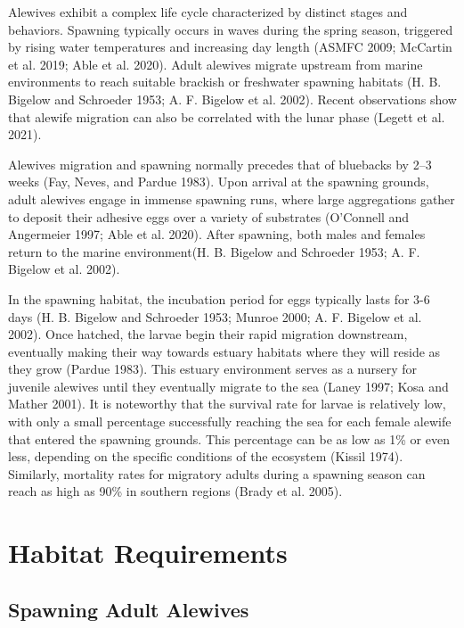 \documentclass[
]{book}
\begin{document}
Alewives exhibit a complex life cycle characterized by distinct stages and behaviors.
Spawning typically occurs in waves during the spring season, triggered by rising water temperatures and increasing day length (ASMFC 2009; McCartin et al. 2019; Able et al. 2020).
Adult alewives migrate upstream from marine environments to reach suitable brackish or freshwater spawning habitats (H. B. Bigelow and Schroeder 1953; A. F. Bigelow et al. 2002).
Recent observations show that alewife migration can also be correlated with the lunar phase (Legett et al. 2021).

Alewives migration and spawning normally precedes that of bluebacks by 2--3 weeks (Fay, Neves, and Pardue 1983).
Upon arrival at the spawning grounds, adult alewives engage in immense spawning runs, where large aggregations gather to deposit their adhesive eggs over a variety of substrates (O'Connell and Angermeier 1997; Able et al. 2020).
After spawning, both males and females return to the marine environment(H. B. Bigelow and Schroeder 1953; A. F. Bigelow et al. 2002).

In the spawning habitat, the incubation period for eggs typically lasts for 3-6 days (H. B. Bigelow and Schroeder 1953; Munroe 2000; A. F. Bigelow et al. 2002).
Once hatched, the larvae begin their rapid migration downstream, eventually making their way towards estuary habitats where they will reside as they grow (Pardue 1983).
This estuary environment serves as a nursery for juvenile alewives until they eventually migrate to the sea (Laney 1997; Kosa and Mather 2001).
It is noteworthy that the survival rate for larvae is relatively low, with only a small percentage successfully reaching the sea for each female alewife that entered the spawning grounds.
This percentage can be as low as 1\% or even less, depending on the specific conditions of the ecosystem (Kissil 1974).
Similarly, mortality rates for migratory adults during a spawning season can reach as high as 90\% in southern regions (Brady et al. 2005).

\hypertarget{habitat-requirements}{%
\section{Habitat Requirements}\label{habitat-requirements}}

\hypertarget{spawning-adult-alewives}{%
\subsection{Spawning Adult Alewives}\label{spawning-adult-alewives}}
\end{document}
